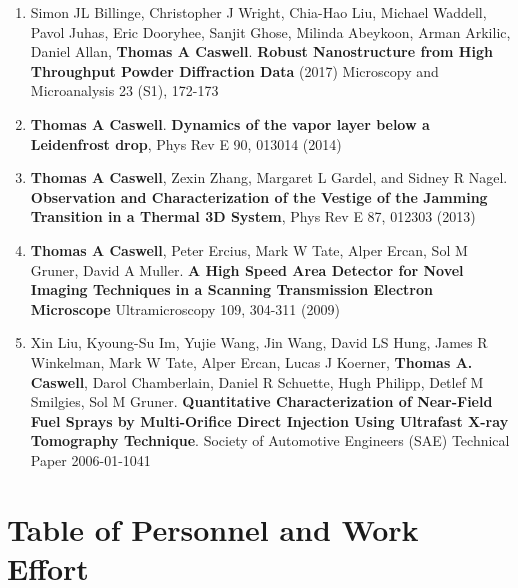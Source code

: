 \documentclass[12pt]{article}
\numberwithin{page}{section}
\begin{document}
\begin{enumerate}[noitemsep]
  \item Simon JL Billinge, Christopher J Wright, Chia-Hao Liu, Michael
    Waddell, Pavol Juhas, Eric Dooryhee, Sanjit Ghose, Milinda
    Abeykoon, Arman Arkilic, Daniel Allan, \textbf{Thomas A Caswell}.
    \textbf{Robust Nanostructure from High Throughput Powder
      Diffraction Data} (2017) Microscopy and Microanalysis 23 (S1),
    172-173

  \item \textbf{Thomas A Caswell}. \textbf{Dynamics of the vapor layer below a
      Leidenfrost drop}, Phys Rev E 90, 013014 (2014)

  \item \textbf{Thomas A Caswell}, Zexin Zhang, Margaret L Gardel, and
    Sidney R Nagel.  \textbf{Observation and Characterization of the
      Vestige of the Jamming Transition in a Thermal 3D System}, Phys
    Rev E 87, 012303 (2013)

  \item \textbf{Thomas A Caswell}, Peter Ercius, Mark W Tate, Alper
    Ercan, Sol M Gruner, David A Muller. \textbf{A High Speed Area
      Detector for Novel Imaging Techniques in a Scanning Transmission
      Electron Microscope} Ultramicroscopy 109, 304-311 (2009)

  \item Xin Liu, Kyoung-Su Im, Yujie Wang, Jin Wang, David LS Hung,
    James R Winkelman, Mark W Tate, Alper Ercan, Lucas J Koerner,
    \textbf{Thomas A. Caswell}, Darol Chamberlain, Daniel R Schuette,
    Hugh Philipp, Detlef M Smilgies, Sol M Gruner. \textbf{Quantitative
      Characterization of Near-Field Fuel Sprays by Multi-Orifice
      Direct Injection Using Ultrafast X-ray Tomography Technique}.
    Society of Automotive Engineers (SAE) Technical Paper 2006-01-1041

\end{enumerate}

\newpage
\section{Table of Personnel and Work Effort}
\setcounter{page}{1}
\end{document}
